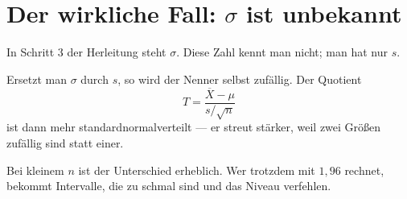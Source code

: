 \section{Der wirkliche Fall: $\sigma$ ist unbekannt}

In Schritt 3 der Herleitung steht $\sigma$. Diese Zahl kennt man nicht; man hat nur $s$.

\begin{warnung}
Ersetzt man $\sigma$ durch $s$, so wird der Nenner selbst zufällig. Der Quotient
\[ T = \frac{\overline X - \mu}{s/\sqrt n} \]
ist dann  mehr standardnormalverteilt --- er streut stärker, weil zwei Größen zufällig sind statt einer.

Bei kleinem $n$ ist der Unterschied erheblich. Wer trotzdem mit $1{,}96$ rechnet, bekommt Intervalle, die zu schmal sind und das Niveau verfehlen.
\end{warnung}

